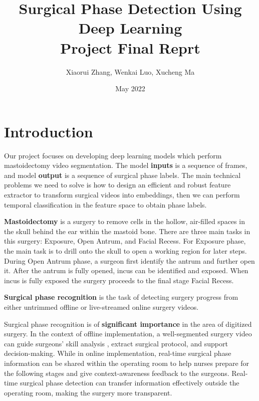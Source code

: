 \documentclass[11pt]{article} \usepackage[top=1in, bottom=1in, left=1in, right=1in]{geometry}
\title{Surgical Phase Detection Using Deep Learning\\ Project Final Reprt}
\author{Xiaorui Zhang, Wenkai Luo, Xucheng Ma}
\date{May 2022}
\begin{document}
\maketitle

\section{Introduction}
Our project focuses on developing deep learning models which perform mastoidectomy video segmentation. The model \textbf{inputs} is a sequence of frames, and model \textbf{output} is a sequence of surgical phase labels. The main technical problems we need to solve is how to design an efficient and robust feature extractor to transform surgical videos into embeddings, then we can perform temporal classification in the feature space to obtain phase labels.

\vspace{0.25cm}
\noindent
\textbf{Mastoidectomy} is a surgery to remove cells in the hollow, air-filled spaces in the skull behind the ear within the mastoid bone. There are three main tasks in this surgery: Exposure, Open Antrum, and Facial Recess. \cite{wiki} For Exposure phase, the main task is to drill onto the skull to open a working region for later steps. During Open Antrum phase, a surgeon first identify the antrum and further open it. After the antrum is fully opened, incus can be identified and exposed. When incus is fully exposed the surgery proceeds to the final stage Facial Recess. 

\vspace{0.25cm}
\noindent
\textbf{Surgical phase recognition} is the task of detecting surgery progress from either untrimmed offline or live-streamed online surgery videos.

\vspace{0.25cm}
\noindent
Surgical phase recognition is of \textbf{significant importance} in the area of digitized surgery. In the context of offline implementation, a well-segmented surgery video can guide surgeons’ skill analysis \cite{SkillEvaluation}, extract surgical protocol, and support decision-making.\cite{WorldHospital} While in online implementation, real-time surgical phase information can be shared within the operating room to help nurses prepare for the following stages and give context-awareness feedback to the surgeons. Real-time surgical phase detection can transfer information effectively outside the operating room, making the surgery more transparent. \cite{ReviewPaper}
\end{document}
